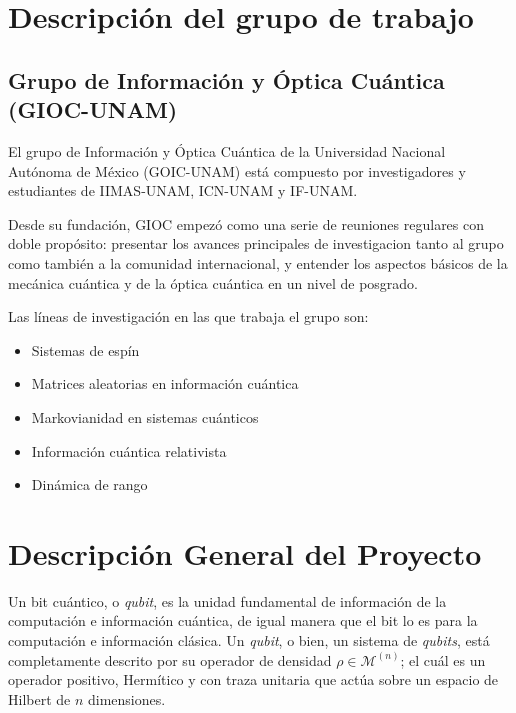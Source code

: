 \documentclass[11pt, spanish, letterpage]{article}
\begin{document}
\section{Descripción del grupo de trabajo}
\subsection{Grupo de Información y Óptica Cuántica (GIOC-UNAM)}
El grupo de Información y Óptica Cuántica de la Universidad Nacional Autónoma de México (GOIC-UNAM) está compuesto por investigadores y estudiantes de IIMAS-UNAM, ICN-UNAM y IF-UNAM. 

Desde su fundación, GIOC empezó como una serie de reuniones regulares con doble propósito: presentar los avances principales de investigacion tanto al grupo como también a la comunidad internacional, y entender los aspectos básicos de la mecánica cuántica y de la óptica cuántica en un nivel de posgrado. 

Las líneas de investigación en las que trabaja el grupo son:
\begin{itemize}
	\item Sistemas de espín
	\item Matrices aleatorias en información cuántica
	\item Markovianidad en sistemas cuánticos
	\item Información cuántica relativista
	\item Dinámica de rango
\end{itemize}
\pagebreak
\section{Descripción General del Proyecto}
Un bit cuántico, o \textit{qubit}, es la unidad fundamental de información de la computación e información cuántica, de igual manera que el bit lo es para la computación e información clásica. Un \textit{qubit}, o bien, un sistema de \textit{qubits}, está completamente descrito por su operador de densidad $\rho \in \mathcal{M}^{(n)}$; el cuál es un operador positivo, Hermítico y con traza unitaria que actúa sobre un espacio de Hilbert de $n$ dimensiones. 

\end{document}
